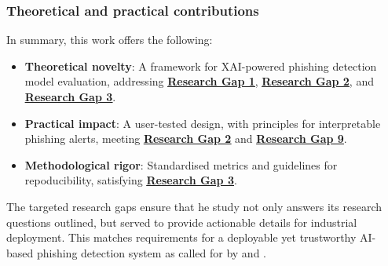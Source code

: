 
\subsubsection*{Theoretical and practical contributions}
In summary, this work offers the following:

\begin{itemize}
  \item \textbf{Theoretical novelty}: A framework for XAI-powered phishing detection model evaluation, addressing \hyperref[research-gap-1]{\uline{\textbf{Research Gap 1}}}, \hyperref[research-gap-2]{\uline{\textbf{Research Gap 2}}}, and \hyperref[research-gap-3]{\uline{\textbf{Research Gap 3}}}.
  \item \textbf{Practical impact}: A user-tested design, with principles for interpretable phishing alerts, meeting \hyperref[research-gap-2]{\uline{\textbf{Research Gap 2}}} and \hyperref[research-gap-9]{\uline{\textbf{Research Gap 9}}}.
  \item \textbf{Methodological rigor}: Standardised metrics and guidelines for repoducibility, satisfying \hyperref[research-gap-3]{\uline{\textbf{Research Gap 3}}}.
\end{itemize}

\noindent The targeted research gaps ensure that he study not only answers its research questions outlined, but served to provide actionable details for industrial deployment. This matches requirements for a deployable yet trustworthy AI-based phishing detection system as called for by \cite{atlam2022business} and \cite{lim2025explicate}.
